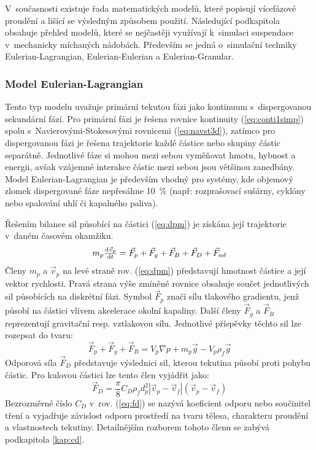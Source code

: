V~současnosti existuje řada matematických modelů, které popisují vícefázové prou\-dě\-ní a lišící se výsledným způsobem použití. Následující podkapitola obsahuje přehled modelů, které se nejčastěji využívají k~simulaci suspendace v~mechanicky míchaných nádobách. Především se jedná o~simulační techniky Eulerian-Lagrangian, Eulerian-Eulerian a Eulerian-Granular.

\subsubsection{Model Eulerian-Lagrangian}
Tento typ modelu uvažuje primární tekutou fázi jako kontinuum s~dispergovanou sekundární fází. Pro primární fázi je řešena rovnice kontinuity (\ref{eq:conti1simp}) spolu s~Navierovými-Stokesovými rovnicemi (\ref{eq:navst3d}), zatímco pro dispergovanou fázi je řešena trajektorie každé částice nebo skupiny částic separátně. Jednotlivé fáze si mohou mezi sebou vyměňovat hmotu, hybnost a energii, avšak vzájemné interakce částic mezi sebou jsou většinou zanedbány. Model Eulerian-Lagrangian je především vhodný pro systémy, kde objemový zlomek dispergované fáze nepřesáhne \SI{10}{\percent} (např: rozprašovací sušárny, cyklóny nebo spalování uhlí či kapalného paliva). 

Řešením bilance sil působící na částici (\ref{eq:dpm}) je získána její trajektorie v~daném časovém okamžiku.
\begin{equation}
	m_{p}\od{\vec{v}_{p}}{t} = \vec{F}_{p} + \vec{F}_{g} + \vec{F}_{B} + \vec{F}_{D} + \vec{F}_{ad}
	\label{eq:dpm}
\end{equation} 
Členy $m_{p}$ a $\vec{v}_{p}$ na levé straně rov. (\ref{eq:dpm}) představují hmotnost částice a její vektor rychlosti. Pravá strana výše zmíněné rovnice obsahuje součet jednotlivých sil působících na diskrétní fázi. Symbol $\vec{F}_{p}$ značí sílu tlakového gradientu, jenž působí na částici vlivem akcelerace okolní kapaliny. Další členy $\vec{F}_{g}$ a $\vec{F}_{B}$ reprezentují gravitační resp. vztlakovou sílu. Jednotlivé příspěvky těchto sil lze rozepsat do tvaru:    
\begin{equation}
	\vec{F}_{p} + \vec{F}_{g} + \vec{F}_{B} = V_{p} \nabla p + m_{p} \vec{g} -  V_{p} \rho_{f} \vec{g}
	\label{eq:force3}
\end{equation} 
 Odporová síla $\vec{F}_{D}$ představuje výslednici sil, kterou tekutina působí proti pohybu částic. Pro kulovou částici lze tento člen vyjádřit jako:
\begin{equation}
	\vec{F}_{D} = \frac{\pi}{8}C_{D}\rho_{f} d_{p}^{2} \left|\vec{v}_{p} - \vec{v}_{f}\right| \left(\vec{v}_{p} - \vec{v}_{f}\right)
	\label{eq:fd}
\end{equation} 
Bezrozměrné číslo $C_{D}$ v~rov. (\ref{eq:fd}) se nazývá koeficient odporu nebo součinitel tření a vyjadřuje závislost odporu prostředí na tvaru tělesa, charakteru proudění a vlastnostech tekutiny. Detailnějším rozborem tohoto členu se zabývá podkapitola \ref{kap:cd}.

